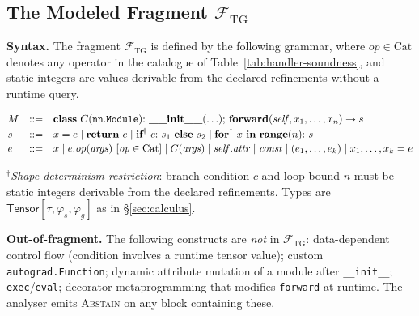 \subsection{The Modeled Fragment $\mathcal{F}_\mathrm{TG}$}
\label{sec:fragment}

\noindent\textbf{Syntax.} The fragment $\mathcal{F}_\mathrm{TG}$ is defined by the following grammar,
where $\mathit{op}\in\mathrm{Cat}$ denotes any operator in the catalogue of
Table~\ref{tab:handler-soundness}, and static integers are values derivable
from the declared refinements without a runtime query.

{\small
\[
\begin{array}{@{}lll@{}}
M &::=& \textbf{class}\ C(\mathtt{nn.Module}){:}\ \textbf{\_\_init\_\_}(\ldots){;}\ \textbf{forward}(\mathit{self}, x_1,\dots,x_n) \to s \\[2pt]
s &::=& x = e \mid \textbf{return}\ e \mid \textbf{if}^{\dagger}\ c{:}\ s_1\ \textbf{else}\ s_2
         \mid \textbf{for}^{\dagger}\ x\ \textbf{in}\ \textbf{range}(n){:}\ s \\[2pt]
e &::=& x \mid e.\mathit{op}(\mathit{args})\ [\mathit{op}\in\mathrm{Cat}]
         \mid C(\mathit{args}) \mid \mathit{self}.\mathit{attr} \mid \mathit{const}
         \mid (e_1,\dots,e_k) \mid x_1,\dots,x_k = e
\end{array}
\]
}

\noindent${}^\dagger$\emph{Shape-determinism restriction}: branch condition $c$ and loop
bound $n$ must be static integers derivable from the declared refinements.
Types are $\mathsf{Tensor}[\tau,\varphi_s,\varphi_g]$ as in \S\ref{sec:calculus}.

\smallskip\noindent\textbf{Out-of-fragment.}
The following constructs are \emph{not} in $\mathcal{F}_\mathrm{TG}$:
data-dependent control flow (condition involves a runtime tensor value);
custom \texttt{autograd.Function}; dynamic attribute mutation of a module
after \texttt{\_\_init\_\_}; \texttt{exec}/\texttt{eval}; decorator
metaprogramming that modifies \texttt{forward} at runtime.
The analyser emits \textsc{Abstain} on any block containing these.

